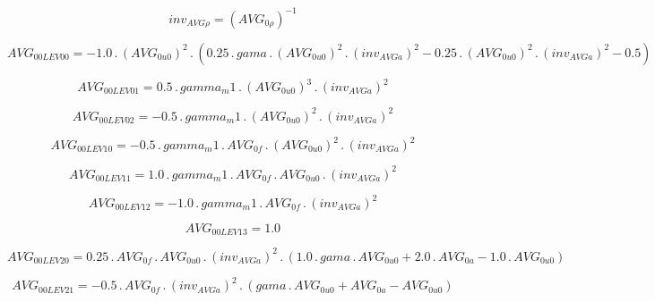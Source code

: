 \documentclass{article}
\begin{document}
\begin{dmath}inv_{AVG \rho} = \left(AVG_{0 \rho} \right)^{-1}\end{dmath}

\begin{dmath}AVG_{0 0 LEV 00} = - 1.0 \,.\, \left(AVG_{0 u0} \right)^{2} \,.\, \left(0.25 \,.\, gama \,.\, \left(AVG_{0 u0} \right)^{2} \,.\, \left(inv_{AVG a} \right)^{2} - 0.25 \,.\, \left(AVG_{0 u0} \right)^{2} \,.\, \left(inv_{AVG a} \right)^{2} 
- 0.5\right)\end{dmath}

\begin{dmath}AVG_{0 0 LEV 01} = 0.5 \,.\, gamma_m1 \,.\, \left(AVG_{0 u0} \right)^{3} \,.\, \left(inv_{AVG a} \right)^{2}\end{dmath}

\begin{dmath}AVG_{0 0 LEV 02} = - 0.5 \,.\, gamma_m1 \,.\, \left(AVG_{0 u0} \right)^{2} \,.\, \left(inv_{AVG a} \right)^{2}\end{dmath}

\begin{dmath}AVG_{0 0 LEV 10} = - 0.5 \,.\, gamma_m1 \,.\, AVG_{0 f} \,.\, \left(AVG_{0 u0} \right)^{2} \,.\, \left(inv_{AVG a} \right)^{2}\end{dmath}

\begin{dmath}AVG_{0 0 LEV 11} = 1.0 \,.\, gamma_m1 \,.\, AVG_{0 f} \,.\, AVG_{0 u0} \,.\, \left(inv_{AVG a} \right)^{2}\end{dmath}

\begin{dmath}AVG_{0 0 LEV 12} = - 1.0 \,.\, gamma_m1 \,.\, AVG_{0 f} \,.\, \left(inv_{AVG a} \right)^{2}\end{dmath}

\begin{dmath}AVG_{0 0 LEV 13} = 1.0\end{dmath}

\begin{dmath}AVG_{0 0 LEV 20} = 0.25 \,.\, AVG_{0 f} \,.\, AVG_{0 u0} \,.\, \left(inv_{AVG a} \right)^{2} \,.\, \left(1.0 \,.\, gama \,.\, AVG_{0 u0} + 2.0 \,.\, AVG_{0 a} - 1.0 \,.\, AVG_{0 u0}\right)\end{dmath}

\begin{dmath}AVG_{0 0 LEV 21} = - 0.5 \,.\, AVG_{0 f} \,.\, \left(inv_{AVG a} \right)^{2} \,.\, \left(gama \,.\, AVG_{0 u0} + AVG_{0 a} - AVG_{0 u0}\right)\end{dmath}
\end{document}
